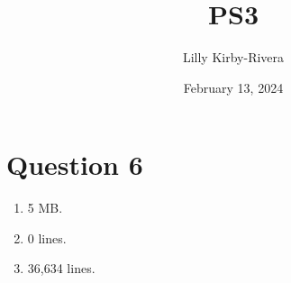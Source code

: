 \documentclass{article}
\title{PS3}
\author{Lilly Kirby-Rivera}
\date{February 13, 2024}
\begin{document}
\maketitle

\section{Question 6}
\begin{enumerate}
    \item 5 MB.
    \item 0 lines.
    \item 36,634 lines.
\end{enumerate}
\end{document}
